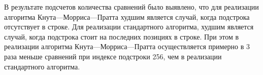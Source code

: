 В результате подсчетов количества сравнений было выявлено, что для реализации алгоритма Кнута---Морриса---Пратта худшим является случай, когда подстрока отсутствует в строке. Для реализации стандартного алгоритма, худшим является случай, когда подстрока стоит на последних позициях в строке. При этом в реализации алгоритма Кнута---Морриса---Пратта осуществляется примерно в 3 раза меньше сравнений при индексе подстроки 256, чем в реализации стандартного алгоритма.


